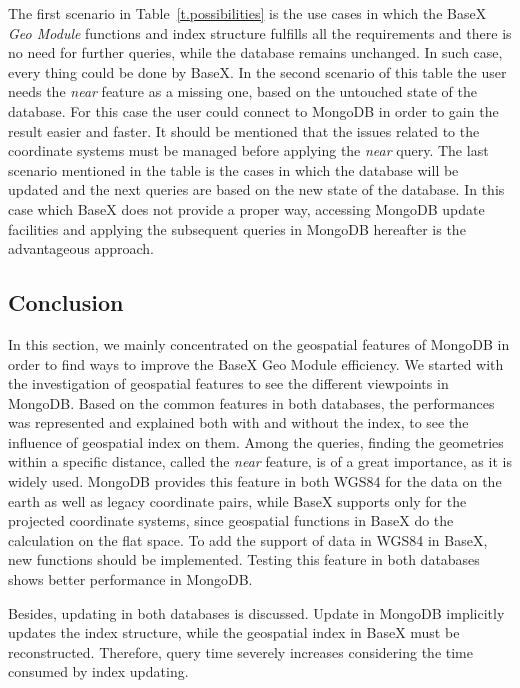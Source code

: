 \documentclass[a4paper,12pt]{article}
\begin{document}
The first scenario in Table~\ref{t.possibilities} is the use cases in which the BaseX \textit{Geo Module} functions and index structure fulfills all the requirements and there is no need for further queries, while the database remains unchanged. In such case, every thing could be done by BaseX. In the second scenario of this table the user needs the \textit{near} feature as a missing one, based on the untouched state of the database. For this case the user could connect to MongoDB in order to gain the result easier and faster. It should be mentioned that the issues related to the coordinate systems must be managed before applying the \textit{near} query. The last scenario mentioned in the table is the cases in which the database will be updated and the next queries are based on the new state of the database. In this case which BaseX does not provide a proper way, accessing MongoDB update facilities and applying the subsequent queries in MongoDB hereafter is the advantageous approach. 

\subsection{Conclusion}
\label{conc}
In this section, we mainly concentrated on the geospatial features of MongoDB in order to find ways to improve the BaseX Geo Module efficiency. We started with the investigation of geospatial features to see the different viewpoints in MongoDB. Based on the common features in both databases, the performances was represented and explained both with and without the index, to see the influence of geospatial index on them.
Among the queries, finding the geometries within a specific distance, called the \textit{near} feature, is of a great importance, as it is widely used. MongoDB provides this feature in both WGS84 for the data on the earth as well as legacy coordinate pairs, while BaseX supports only for the projected coordinate systems, since geospatial functions in BaseX do the calculation on the flat space. To add the support of data in WGS84 in BaseX, new functions should be implemented. Testing this feature in both databases shows better performance in MongoDB. 

Besides, updating in both databases is discussed. Update in MongoDB implicitly updates the index structure, while the geospatial index in BaseX must be reconstructed. Therefore, query time severely increases considering the time consumed by index updating. 
\end{document}
